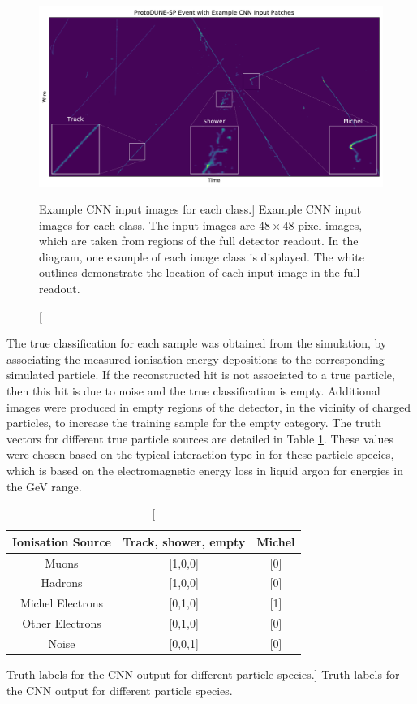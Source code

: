 \begin{figure}
	\centering
	\includegraphics[width=\textwidth]{figures/patch_zoom.pdf}  
	\caption
	[Example CNN input images for each class.]
	{Example CNN input images for each class. The input images are $48 \times 48$
	pixel images, which are taken from regions of the full detector readout. In
	the diagram, one example of each image class is displayed. The white outlines
	demonstrate the location of each input image in the full readout.}
	\label{fig:patches}
\end{figure}

The true classification for each sample was obtained from the simulation, by 
associating the measured ionisation energy depositions to the corresponding
simulated particle. If the reconstructed hit is not associated to a true
particle, then this hit is due to noise and the true classification is empty.
Additional images were produced in empty regions of the detector, in the 
vicinity of charged particles, to increase the training sample for the empty 
category. The truth vectors for different true particle sources are detailed 
in Table \ref{tab:ground_truth}. These values were chosen based on the typical 
interaction type in \protodune{} for these particle species, which is based on 
the electromagnetic energy loss in liquid argon for energies in the GeV range.
\begin{table}
	\centering
	\bgroup
	\def\arraystretch{1.5}
	\begin{tabular}{c|c|c}
		Ionisation Source & Track, shower, empty & Michel \\ \hline
		Muons             & [1,0,0]              & [0]    \\
		Hadrons           & [1,0,0]              & [0]    \\
		Michel Electrons  & [0,1,0]              & [1]    \\
		Other Electrons   & [0,1,0]              & [0]    \\
		Noise             & [0,0,1]              & [0]    \\
	\end{tabular}
	\egroup
	\caption
	[Truth labels for the CNN output for different particle species.]
	{Truth labels for the CNN output for different particle species.}
	\label{tab:ground_truth}
\end{table}

